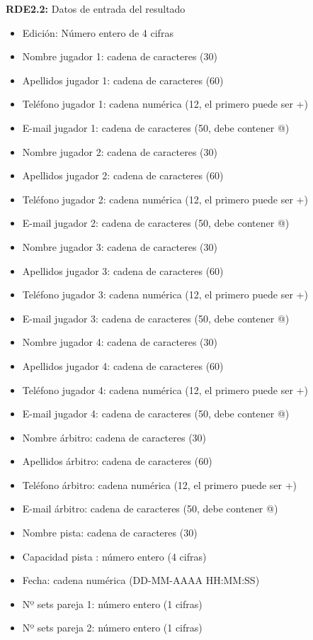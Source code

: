 \textbf{RDE2.2:} Datos de entrada del resultado
\begin{itemize}
	\item Edición: Número entero de 4 cifras
\newline
	\item Nombre jugador 1: cadena de caracteres (30)
	\item Apellidos jugador 1: cadena de caracteres (60)
	\item Teléfono jugador 1: cadena numérica (12, el primero puede ser +)
	\item E-mail jugador 1: cadena de caracteres (50, debe contener @)
\newline
	\item Nombre jugador 2: cadena de caracteres (30)
	\item Apellidos jugador 2: cadena de caracteres (60)
	\item Teléfono jugador 2: cadena numérica (12, el primero puede ser +)
	\item E-mail jugador 2: cadena de caracteres (50, debe contener @)
\newline
	\item Nombre jugador 3: cadena de caracteres (30)
	\item Apellidos jugador 3: cadena de caracteres (60)
	\item Teléfono jugador 3: cadena numérica (12, el primero puede ser +)
	\item E-mail jugador 3: cadena de caracteres (50, debe contener @)
\newline
	\item Nombre jugador 4: cadena de caracteres (30)
	\item Apellidos jugador 4: cadena de caracteres (60)
	\item Teléfono jugador 4: cadena numérica (12, el primero puede ser +)
	\item E-mail jugador 4: cadena de caracteres (50, debe contener @)
\newline
	\item Nombre árbitro: cadena de caracteres (30)
	\item Apellidos árbitro: cadena de caracteres (60)
	\item Teléfono árbitro: cadena numérica (12, el primero puede ser +)
	\item E-mail árbitro: cadena de caracteres (50, debe contener @)
\newline
	\item Nombre pista: cadena de caracteres (30)
	\item Capacidad pista : número entero (4 cifras)
	\item Fecha: cadena numérica (DD-MM-AAAA HH:MM:SS)
\newline
	\item Nº sets pareja 1: número entero (1 cifras)
	\item Nº sets pareja 2: número entero (1 cifras)
\end{itemize}


